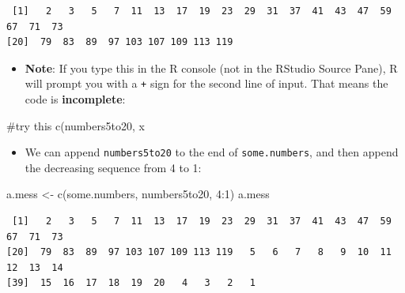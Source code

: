 \documentclass[
  9pt,
  a4paper,
  ignorenonframetext,
  notheorems]{beamer}
\newenvironment{Shaded}{\begin{snugshade}}{\end{snugshade}}
\newcommand{\CommentTok}[1]{\textcolor[rgb]{0.37,0.37,0.37}{#1}}
\newcommand{\DecValTok}[1]{\textcolor[rgb]{0.68,0.00,0.00}{#1}}
\newcommand{\FunctionTok}[1]{\textcolor[rgb]{0.28,0.35,0.67}{#1}}
\newcommand{\NormalTok}[1]{\textcolor[rgb]{0.00,0.23,0.31}{#1}}
\newcommand{\OtherTok}[1]{\textcolor[rgb]{0.00,0.23,0.31}{#1}}
\newcommand{\SpecialCharTok}[1]{\textcolor[rgb]{0.37,0.37,0.37}{#1}}
\providecommand{\tightlist}{%
  \setlength{\itemsep}{0pt}\setlength{\parskip}{0pt}}\usepackage{longtable,booktabs,array}
\begin{document}
\begin{frame}[fragile]
\begin{verbatim}
 [1]   2   3   5   7  11  13  17  19  23  29  31  37  41  43  47  59  67  71  73
[20]  79  83  89  97 103 107 109 113 119
\end{verbatim}
\end{frame}

\begin{frame}[fragile]
\begin{itemize}
\tightlist
\item
  \textbf{Note}: If you type this in the R console (not in the RStudio
  Source Pane), R will prompt you with a \texttt{+} sign for the second
  line of input. That means the code is \textbf{incomplete}:
\end{itemize}

\begin{Shaded}
\begin{Highlighting}[]
\CommentTok{\#try this}
\FunctionTok{c}\NormalTok{(numbers5to20, x}
\end{Highlighting}
\end{Shaded}

\begin{itemize}
\tightlist
\item
  We can append \texttt{numbers5to20} to the end of
  \texttt{some.numbers}, and then append the decreasing sequence from 4
  to 1:
\end{itemize}

\begin{Shaded}
\begin{Highlighting}[]
\NormalTok{a.mess }\OtherTok{\textless{}{-}} \FunctionTok{c}\NormalTok{(some.numbers, numbers5to20, }\DecValTok{4}\SpecialCharTok{:}\DecValTok{1}\NormalTok{) }
\NormalTok{a.mess}
\end{Highlighting}
\end{Shaded}

\begin{verbatim}
 [1]   2   3   5   7  11  13  17  19  23  29  31  37  41  43  47  59  67  71  73
[20]  79  83  89  97 103 107 109 113 119   5   6   7   8   9  10  11  12  13  14
[39]  15  16  17  18  19  20   4   3   2   1
\end{verbatim}
\end{frame}
\end{document}
